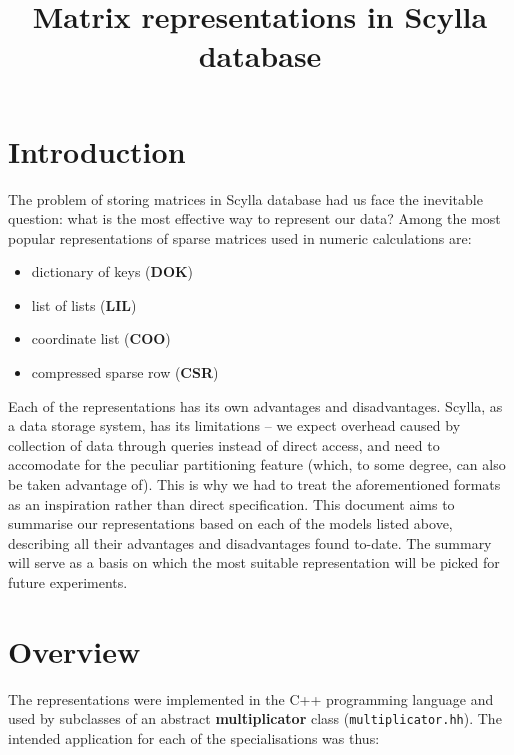 \documentclass{article}
\begin{document}
\thispagestyle{empty}\phantom{m} \vspace{4em}

\title{Matrix representations in Scylla database}
\date{}
\author{}
\maketitle

\section*{Introduction}
The problem of storing matrices in Scylla database had us face the inevitable question: what is the most effective way to represent our data? 
Among the most popular representations of sparse matrices used in numeric calculations are:
\begin{itemize}
\item dictionary of keys (\textbf{DOK})
\item list of lists (\textbf{LIL})
\item coordinate list (\textbf{COO})
\item compressed sparse row (\textbf{CSR})
\end{itemize}
Each of the representations has its own advantages and disadvantages. Scylla, as a data storage system, has its limitations -- we expect overhead caused by collection of data through queries instead of direct access, and need to accomodate for the peculiar partitioning feature (which, to some degree, can also be taken advantage of). This is why we had to treat the aforementioned formats as an inspiration rather than direct specification. This document aims to summarise our representations based on each of the models listed above, describing all their advantages and disadvantages found to-date. The summary will serve as a basis on which the most suitable representation will be picked for future experiments.

\pagebreak
\section*{Overview}

The representations were implemented in the C++ programming language and used by subclasses of an abstract \textbf{multiplicator} class (\texttt{multiplicator.hh}). The intended application for each of the specialisations was thus:
\end{document}
